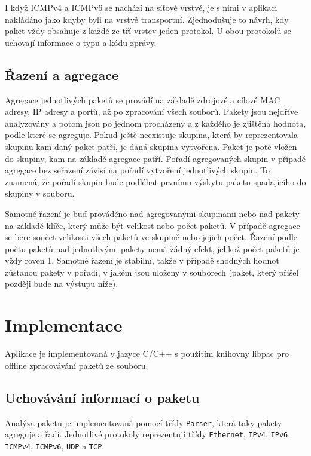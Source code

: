 \documentclass[11pt, a4paper]{article}
\begin{document}
I když ICMPv4 a ICMPv6 se nachází na síťové vrstvě, je s nimi v aplikaci nakládáno jako kdyby byli na vrstvě transportní. 
Zjednodušuje to návrh, kdy paket vždy obsahuje z každé ze tří vrstev jeden protokol. 
U obou protokolů se uchovají informace o typu a kódu zprávy.

\subsection{Řazení a agregace}

Agregace jednotlivých paketů se provádí na základě zdrojové a cílové MAC adresy, IP adresy a portů, až po zpracování všech souborů. 
Pakety jsou nejdříve analyzovány a potom jsou po jednom procházeny a z každého je zjištěna hodnota, podle které se agreguje. 
Pokud ještě neexistuje skupina, která by reprezentovala skupinu kam daný paket patří, je daná skupina vytvořena.
Paket je poté vložen do skupiny, kam na základě agregace patří. 
Pořadí agregovaných skupin v případě agregace bez seřazení závisí na pořadí vytvoření jednotlivých skupin. 
To znamená, že pořadí skupin bude podléhat prvnímu výskytu paketu spadajícího do skupiny v souboru.

Samotné řazení je buď prováděno nad agregovanými skupinami nebo nad pakety na základě klíče, který může být velikost nebo počet paketů. 
V případě agregace se bere součet velikosti všech paketů ve skupině nebo jejich počet. 
Řazení podle počtu paketů nad jednotlivými pakety nemá žádný efekt, jelikož počet paketů je vždy roven 1. 
Samotné řazení je stabilní, takže v případě shodných hodnot zůstanou pakety v pořadí, v jakém jsou uloženy v souborech (paket, který přišel později bude na výstupu níže).

\section{Implementace}

Aplikace je implementovaná v jazyce C/C++ s použitím knihovny libpac pro offline zpracovávání paketů ze souboru.

\subsection{Uchovávání informací o paketu}

Analýza paketu je implementovaná pomocí třídy \texttt{Parser}, která taky pakety agreguje a řadí. Jednotlivé protokoly reprezentují třídy \texttt{Ethernet}, \texttt{IPv4}, \texttt{IPv6}, \texttt{ICMPv4}, \texttt{ICMPv6}, \texttt{UDP} a \texttt{TCP}. 
\end{document}
